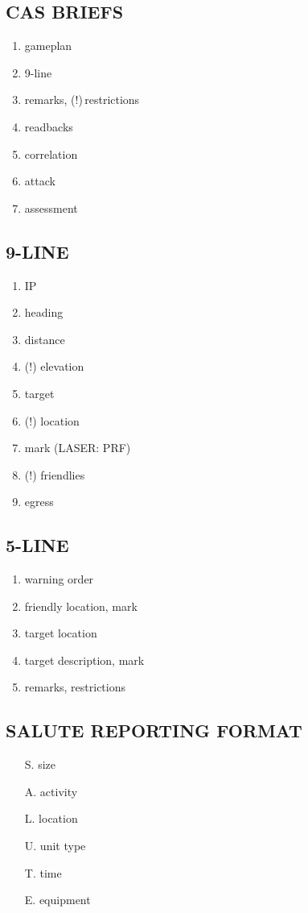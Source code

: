 \documentclass[
  7pt,
  headinclude=false,
  footinclude=false,
  portrait,
  paper=15cm:10cm,
  twocolumn,
]{scrartcl}
\begin{document}
\subsection*{CAS BRIEFS}
\begin{enumerate}
  \item gameplan
  \item 9-line
  \item remarks, (!)\,restrictions
  \item readbacks
  \item correlation
  \item attack
  \item assessment
\end{enumerate}

\subsection*{9-LINE}
\begin{enumerate}
  \item IP
  \item heading
  \item distance \vspace*{0.8ex}
  \item (!) elevation 
  \item target
  \item (!) location \vspace*{0.8ex}
  \item mark (LASER: PRF)
  \item (!) friendlies
  \item egress
\end{enumerate}

\subsection*{5-LINE}
\begin{enumerate}
  \item warning order
  \item friendly location, mark
  \item target location
  \item target description, mark
  \item remarks, restrictions
\end{enumerate}

\subsection*{SALUTE REPORTING FORMAT}
\begin{itemize}[labelindent=0.6em]
  \item [S.] size
  \item [A.] activity
  \item [L.] location
  \item [U.] unit type
  \item [T.] time
  \item [E.] equipment
\end{itemize}
\end{document}
